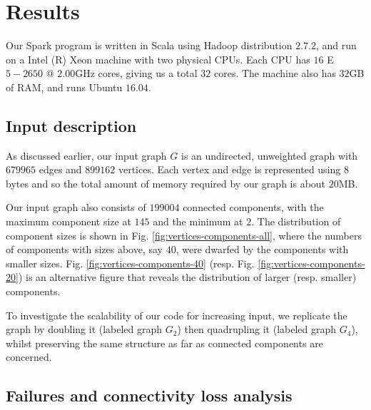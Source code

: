 \section{Results}
\label{results}

Our Spark program is written in Scala using Hadoop distribution $2.7.2$, and run on a Intel (R) Xeon machine with two physical CPUs. Each CPU has $16$ E$5-2650$ @ $2.00$GHz cores, giving us a total $32$ cores. The machine also has $32$GB of RAM, and runs Ubuntu $16.04$.  

\subsection{Input description}

As discussed earlier, our input graph $G$ is an undirected, unweighted graph with $679965$ edges and $899162$ vertices. Each vertex and edge is represented using 8 bytes and so the total amount of memory required by our graph is about $20$MB. 

Our input graph also consists of $199004$ connected components, with the maximum component size at $145$ and the minimum at $2$. The distribution of component sizes is shown in Fig. \ref{fig:vertices-components-all}, where the numbers of components with sizes above, say $40$, were dwarfed by the components with smaller sizes. Fig. \ref{fig:vertices-components-40} (resp. Fig. \ref{fig:vertices-components-20}) is an alternative figure that reveals the distribution of larger (resp. smaller) components. 

To investigate the scalability of our code for increasing input, we replicate the graph by doubling it (labeled graph $G_2$) then quadrupling it (labeled graph $G_4$), whilst preserving the same structure as far as connected components are concerned.

\subsection{Failures and connectivity loss analysis}

